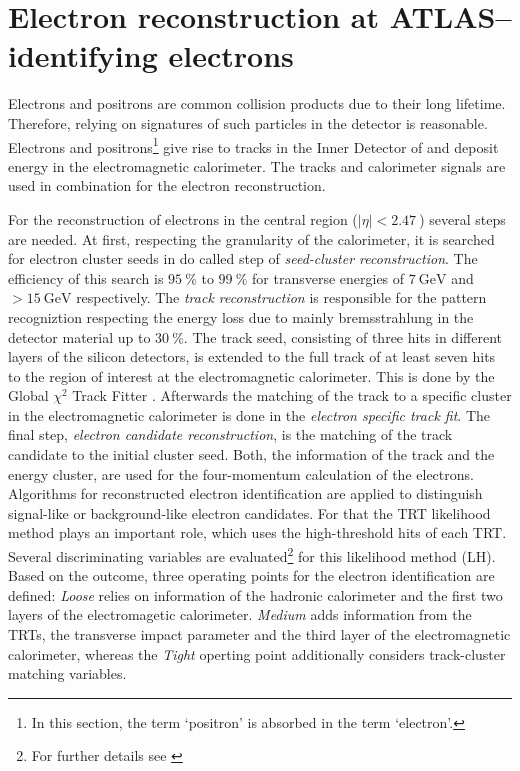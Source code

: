 \section{Electron reconstruction at ATLAS-- identifying electrons}
Electrons and positrons are common collision products due to their long lifetime. Therefore, relying on signatures of such particles in the detector is reasonable. Electrons and positrons\footnote{In this section, the term `positron' is absorbed in the term `electron'.} give rise to tracks in the Inner Detector of {\ATLAS} and deposit energy in the electromagnetic calorimeter. The tracks and calorimeter signals are used in combination for the electron reconstruction. \cite{ePerformance}\par
For the reconstruction of electrons in the central region ($|\eta|<\SI{2.47}{}$) several steps are needed. At first, respecting the granularity of the calorimeter, it is searched for electron cluster seeds in do called step of \textit{seed-cluster reconstruction}. The efficiency of this search is $\SI{95}{\percent}$ to $\SI{99}{\percent}$ for transverse energies of $\SI{7}{\giga\electronvolt}$ and $>\SI{15}{\giga\electronvolt}$ respectively. The \textit{track reconstruction} is responsible for the pattern recogniztion respecting the energy loss due to mainly bremsstrahlung in the detector material up to $\SI{30}{\percent}$. The track seed, consisting of three hits in different layers of the silicon detectors, is extended to the full track of at least seven hits to the region of interest  at the electromagnetic calorimeter. This is done by the {\ATLAS} Global $\chi^2$ Track Fitter \cite{trackfitter}. Afterwards the matching of the track to a specific cluster in the electromagnetic calorimeter is done in the \textit{electron specific track fit}. The final step, \textit{electron candidate reconstruction}, is the matching of the track candidate to the initial cluster seed. \cite{ePerformance}\newline
Both, the information of the track and the energy cluster, are used for the four-momentum calculation of the electrons. Algorithms for reconstructed electron identification are applied to distinguish signal-like or background-like electron candidates. For that the TRT likelihood method plays an important role, which uses the high-threshold hits of each TRT. Several discriminating variables are evaluated\footnote{For further details see \cite{ePerformance}} for this likelihood method (LH). Based on the outcome, three operating points for the electron identification are defined: \textit{Loose} relies on information of the hadronic calorimeter and the first two layers of the electromagetic calorimeter. \textit{Medium} adds information from the TRTs, the transverse impact parameter and the third layer of the electromagnetic calorimeter, whereas the \textit{Tight} operting point additionally considers track-cluster matching variables. \cite{ePerformance}\newline

